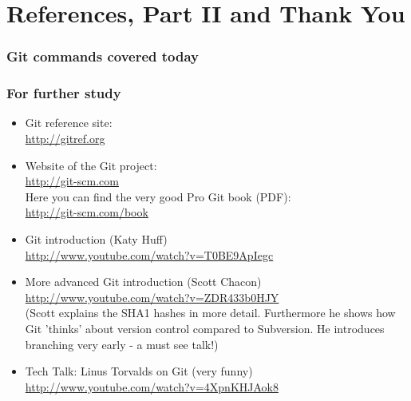 \documentclass[handout,notes]{gittalk}
\begin{document}
\section{References, Part II and Thank You}

\begin{frame}
\frametitle{Git commands covered today}
\begin{center}
        
\end{center}
\end{frame}

\begin{frame}
\frametitle{For further study}
\begin{itemize}
  \item Git reference site:\\
  \url{http://gitref.org}
  \item Website of the Git project:\\
  \url{http://git-scm.com}\\
  Here you can find the very good Pro Git book (PDF):\\
  \url{http://git-scm.com/book}
  \item Git introduction (Katy Huff)\\
        \url{http://www.youtube.com/watch?v=T0BE9ApIegc}
  \item More advanced Git introduction (Scott Chacon)\\
        \url{http://www.youtube.com/watch?v=ZDR433b0HJY}\\
        (Scott explains the SHA1 hashes in more detail. Furthermore he shows
        how Git 'thinks' about version control compared to Subversion. He
        introduces branching very early - a must see talk!)
  \item Tech Talk: Linus Torvalds on Git (very funny)\\
        \url{http://www.youtube.com/watch?v=4XpnKHJAok8}
\end{itemize}
\end{frame}
\end{document}
